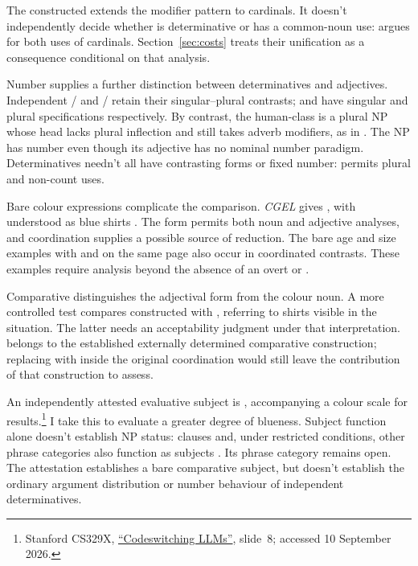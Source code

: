 \documentclass[12pt]{article}
\begin{document}
The constructed  extends the modifier pattern to cardinals. It doesn't independently decide whether  is determinative or has a common-noun use: \textcite{reynolds2026numerals} argues for both uses of cardinals. Section~\ref{sec:costs} treats their unification as a consequence conditional on that analysis.

Number supplies a further distinction between determinatives and adjectives. Independent /\allowbreak{} and /\allowbreak{} retain their singular--plural contrasts;  and  have singular and plural specifications respectively. By contrast, the human-class  is a plural NP whose head lacks plural inflection and still takes adverb modifiers, as in  \citep[418]{huddleston2002}. The NP has number even though its adjective has no nominal number paradigm. Determinatives needn't all have contrasting forms or fixed number:  permits plural and non-count uses.

Bare colour expressions complicate the comparison. \textit{CGEL} gives , with  understood as blue shirts \citep[417]{huddleston2002}. The form permits both noun and adjective analyses, and coordination supplies a possible source of reduction. The bare age and size examples with  and  on the same page also occur in coordinated contrasts. These examples require analysis beyond the absence of an overt  or .

Comparative  distinguishes the adjectival form from the colour noun. A more controlled test compares constructed  with , referring to shirts visible in the situation. The latter needs an acceptability judgment under that interpretation.  belongs to the established externally determined comparative construction; replacing  with  inside the original coordination would still leave the contribution of that construction to assess.

An independently attested evaluative subject is , accompanying a colour scale for results.\footnote{Stanford CS329X, \href{https://web.stanford.edu/class/cs329x/slides/Lecture12_B_Codeswitching\%20LLMs.pdf}{\enquote{Codeswitching LLMs}}, slide~8; accessed 10 September 2026.} I take this to evaluate a greater degree of blueness. Subject function alone doesn't establish NP status: clauses and, under restricted conditions, other phrase categories also function as subjects \citep[236]{huddleston2002}. Its phrase category remains open. The attestation establishes a bare comparative subject, but doesn't establish the ordinary argument distribution or number behaviour of independent determinatives.
\end{document}
